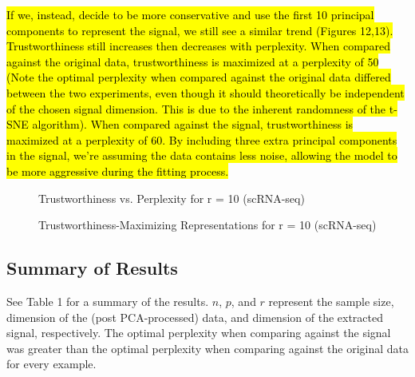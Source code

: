 \documentclass{article}
\begin{document}
\hl{If we, instead, decide to be more conservative and use the first 10 principal components to represent the signal, we still see a similar trend (Figures 12,13). Trustworthiness still increases then decreases with perplexity. When compared against the original data, trustworthiness is maximized at a perplexity of 50 (Note the optimal perplexity when compared against the original data differed between the two experiments, even though it should theoretically be independent of the chosen signal dimension. This is due to the inherent randomness of the t-SNE algorithm). When compared against the signal, trustworthiness is maximized at a perplexity of 60. By including three extra principal components in the signal, we're assuming the data contains less noise, allowing the model to be more aggressive during the fitting process.}

\renewcommand{\thefigure}{12}
\begin{figure}[H]
\centering
\caption{Trustworthiness vs. Perplexity for r = 10 (scRNA-seq)}
\end{figure}

\renewcommand{\thefigure}{13}
\begin{figure}[H]
\centering
\caption{Trustworthiness-Maximizing Representations for r = 10 (scRNA-seq)}
\end{figure}

\subsection{Summary of Results}
See Table 1 for a summary of the results. $n$, $p$, and $r$ represent the sample size, dimension of the (post PCA-processed) data, and dimension of the extracted signal, respectively. The optimal perplexity when comparing against the signal was greater than the optimal perplexity when comparing against the original data for every example.
\end{document}
